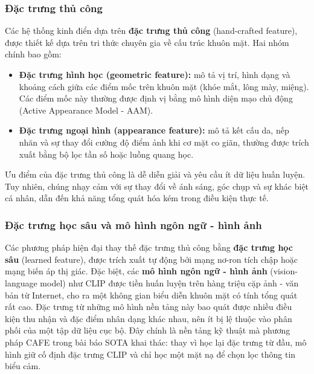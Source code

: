 \subsubsection{Đặc trưng thủ công}
Các hệ thống kinh điển dựa trên \textbf{đặc trưng thủ công} (hand-crafted feature), được thiết kế dựa trên tri thức chuyên gia về cấu trúc khuôn mặt. Hai nhóm chính bao gồm:
\begin{itemize}
    \item \textbf{Đặc trưng hình học (geometric feature):} mô tả vị trí, hình dạng và khoảng cách giữa các điểm mốc trên khuôn mặt (khóe mắt, lông mày, miệng). Các điểm mốc này thường được định vị bằng mô hình diện mạo chủ động (Active Appearance Model - AAM).
    \item \textbf{Đặc trưng ngoại hình (appearance feature):} mô tả kết cấu da, nếp nhăn và sự thay đổi cường độ điểm ảnh khi cơ mặt co giãn, thường được trích xuất bằng bộ lọc tần số hoặc luồng quang học.
\end{itemize}
Ưu điểm của đặc trưng thủ công là dễ diễn giải và yêu cầu ít dữ liệu huấn luyện. Tuy nhiên, chúng nhạy cảm với sự thay đổi về ánh sáng, góc chụp và sự khác biệt cá nhân, dẫn đến khả năng tổng quát hóa kém trong điều kiện thực tế.

\subsubsection{Đặc trưng học sâu và mô hình ngôn ngữ - hình ảnh}
Các phương pháp hiện đại thay thế đặc trưng thủ công bằng \textbf{đặc trưng học sâu} (learned feature), được trích xuất tự động bởi mạng nơ-ron tích chập hoặc mạng biến áp thị giác. Đặc biệt, các \textbf{mô hình ngôn ngữ - hình ảnh} (vision-language model) như CLIP được tiền huấn luyện trên hàng triệu cặp ảnh - văn bản từ Internet, cho ra một không gian biểu diễn khuôn mặt có tính tổng quát rất cao. Đặc trưng từ những mô hình nền tảng này bao quát được nhiều điều kiện thu nhận và đặc điểm nhân dạng khác nhau, nên ít bị lệ thuộc vào phân phối của một tập dữ liệu cục bộ. Đây chính là nền tảng kỹ thuật mà phương pháp CAFE trong bài báo SOTA khai thác: thay vì học lại đặc trưng từ đầu, mô hình giữ cố định đặc trưng CLIP và chỉ học một mặt nạ để chọn lọc thông tin biểu cảm.

